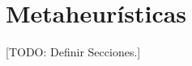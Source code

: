 \documentclass{subfiles}
\begin{document}
  \chapter{Metaheurísticas}
  \label{chap:metaheuristics}

    [TODO: Definir Secciones.]
\end{document}
